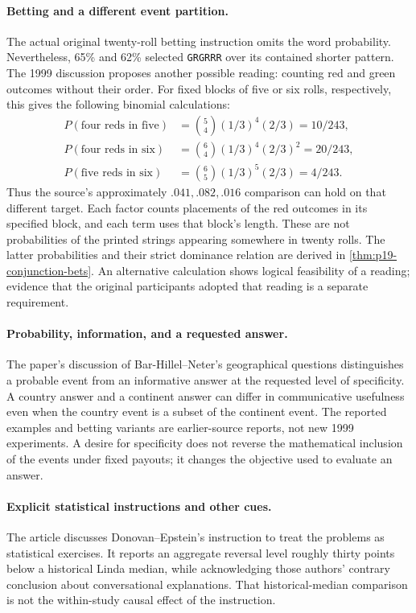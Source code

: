 \paragraph{Betting and a different event partition.}
The actual original twenty-roll betting instruction omits the
word probability. Nevertheless, 65\% and 62\% selected
\texttt{GRGRRR} over its contained shorter pattern.
The 1999 discussion proposes another possible reading:
counting red and green outcomes without their order.
For fixed blocks of five or six rolls, respectively, this
gives the following binomial calculations:
\[
\begin{aligned}
 P(\text{four reds in five})&={5\choose4}(1/3)^4(2/3)
                                      =10/243,\\
 P(\text{four reds in six})&={6\choose4}(1/3)^4(2/3)^2
                                      =20/243,\\
 P(\text{five reds in six})&={6\choose5}(1/3)^5(2/3)
                                      =4/243.
\end{aligned}
\]
Thus the source's approximately \(.041,.082,.016\)
comparison can hold on that different target.
Each factor counts placements of the red outcomes in its
specified block, and each term uses that block's length.
These are not probabilities of the printed strings appearing
somewhere in twenty rolls. The latter probabilities and their
strict dominance relation are derived in
\cref{thm:p19-conjunction-bets}.
An alternative calculation shows logical feasibility of a
reading; evidence that the original participants adopted
that reading is a separate requirement.

\paragraph{Probability, information, and a requested answer.}
The paper's discussion of Bar-Hillel--Neter's geographical
questions distinguishes a probable event from an informative
answer at the requested level of specificity.
A country answer and a continent answer can differ in
communicative usefulness even when the country event is a
subset of the continent event. The reported examples and
betting variants are earlier-source reports, not new 1999
experiments. A desire for specificity does not reverse
the mathematical inclusion of the events under fixed payouts;
it changes the objective used to evaluate an answer.

\paragraph{Explicit statistical instructions and other cues.}
The article discusses Donovan--Epstein's instruction to treat
the problems as statistical exercises. It reports an aggregate
reversal level roughly thirty points below a historical Linda
median, while acknowledging those authors' contrary conclusion
about conversational explanations.
That historical-median comparison is not the within-study
causal effect of the instruction.

